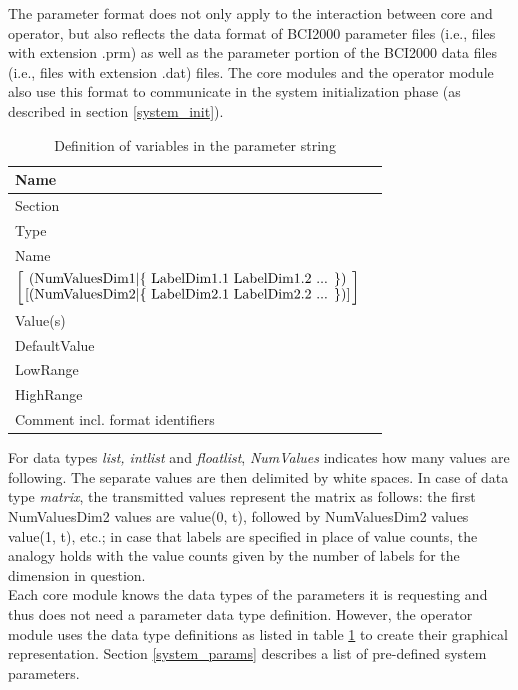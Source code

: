 \documentclass[letterpaper,oneside,12pt]{book}
\begin{document}
The parameter format does not only apply to the interaction between core and 
operator, but also reflects the data format of BCI2000 parameter files (i.e., 
files with extension .prm) as well as the parameter portion of the BCI2000 data 
files (i.e., files with extension .dat) files. The core modules and the operator 
module also use this format to communicate in the system initialization phase 
(as described in section \ref{system_init}).

\begin{table}[ht]
 \centering
 \begin{tabular}{|l|l|}
  \hline
  \textbf{Name} \\
  \hline
  Section \\
  \hline
  Type \\
  \hline
  Name \\
  \hline
  ${\left[
    \mbox{(NumValuesDim1$\mid$\{ LabelDim1.1 LabelDim1.2 ... \})}
    \atop
    \mbox{[(NumValuesDim2$\mid$\{ LabelDim2.1 LabelDim2.2 ... \})]}
    \right]}$ \\
  \hline
  Value(s) \\
  \hline
  DefaultValue \\
  \hline
  LowRange \\
  \hline
  HighRange \\
  \hline
  Comment incl. format identifiers \\
  \hline
 \end{tabular}
 \caption{Definition of variables in the parameter string}
 \label{tab:parametervariables}
\end{table}   

For data types \textit{list, intlist} and \textit{floatlist}, \textit{NumValues} 
indicates how many values are following. The separate values are then 
delimited by white spaces. In case of data type \textit{matrix}, the transmitted 
values represent the matrix as follows: the first NumValuesDim2 values are 
value(0, t), followed by NumValuesDim2 values value(1, t), etc.; in case that 
labels are specified in place of value counts, the analogy holds with the value 
counts given by the number of labels for the dimension in question.\\

Each core module knows the data types of the parameters it is requesting and 
thus does not need a parameter data type definition. However, the operator 
module uses the data type definitions as listed in table 
\ref{tab:parametervariables} to create their graphical representation. Section 
\ref{system_params} describes a list of pre-defined system parameters.
\end{document}
